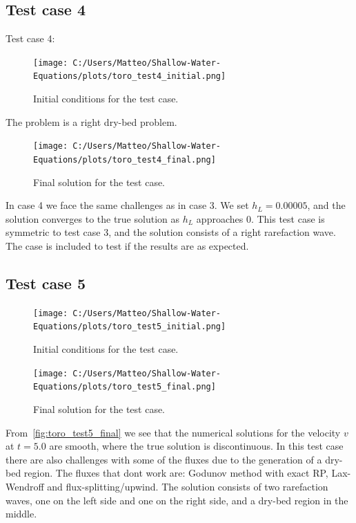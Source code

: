 \subsection*{Test case 4}

Test case 4:
\begin{figure}[H]
    \centering
    \texttt{[image: C:/Users/Matteo/Shallow-Water-Equations/plots/toro\_test4\_initial.png]}
    \caption{Initial conditions for the test case.}\label{fig:toro_test4_initial}
\end{figure}
The problem is a right dry-bed problem.

\begin{figure}[H]
    \centering
    \texttt{[image: C:/Users/Matteo/Shallow-Water-Equations/plots/toro\_test4\_final.png]}
    \caption{Final solution for the test case.}\label{fig:toro_test4_final}
\end{figure}
In case 4 we face the same challenges as in case 3.
We set $h_L = 0.00005$, and the solution converges to the true solution as $h_L$ approaches 0.
This test case is symmetric to test case 3, and the solution consists of a right rarefaction wave.
The case is included to test if the results are as expected.

\subsection*{Test case 5}

\begin{figure}[H]
    \centering
    \texttt{[image: C:/Users/Matteo/Shallow-Water-Equations/plots/toro\_test5\_initial.png]}
    \caption{Initial conditions for the test case.}\label{fig:toro_test5_initial}
\end{figure}

\begin{figure}[H]
    \centering
    \texttt{[image: C:/Users/Matteo/Shallow-Water-Equations/plots/toro\_test5\_final.png]}
    \caption{Final solution for the test case.}\label{fig:toro_test5_final}
\end{figure}
From~\autoref{fig:toro_test5_final} we see that the numerical solutions for the velocity $v$ at $t=5.0$ are smooth, where the true solution is discontinuous. 
In this test case there are also challenges with some of the fluxes due to the generation of a dry-bed region.
The fluxes that dont work are: Godunov method with exact RP, Lax-Wendroff and flux-splitting/upwind.
The solution consists of two rarefaction waves, one on the left side and one on the right side, and a dry-bed region in the middle.

